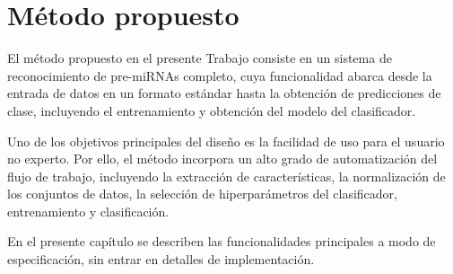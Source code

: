 \iflatexml\setcounter{chapter}{3}\fi
%
%
%
%
\chapter{Método propuesto}
%
El método propuesto en el presente Trabajo consiste en un sistema de
reconocimiento de pre-miRNAs completo, cuya funcionalidad abarca desde
la entrada de datos en un formato estándar hasta la obtención de
predicciones de clase, incluyendo el entrenamiento y obtención del
modelo del clasificador.

Uno de los objetivos principales del diseño es la facilidad de uso
para el usuario no experto. Por ello, el método incorpora un alto
grado de automatización del flujo de trabajo, incluyendo la extracción
de características, la normalización de los conjuntos de datos, la
selección de hiperparámetros del clasificador, entrenamiento y
clasificación.

En el presente capítulo se describen las funcionalidades principales a
modo de especificación, sin entrar en detalles de implementación.

